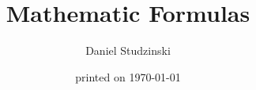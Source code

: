 \documentclass[a4paper,10pt,twoside,titltpage]{article}
\begin{document}
\title{Mathematic Formulas}
\date{printed on \today}
\author{Daniel Studzinski}
\maketitle                        \clearpage
   \clearpage
\tableofcontents                  \cleardoublepage














\printindex
\end{document}
